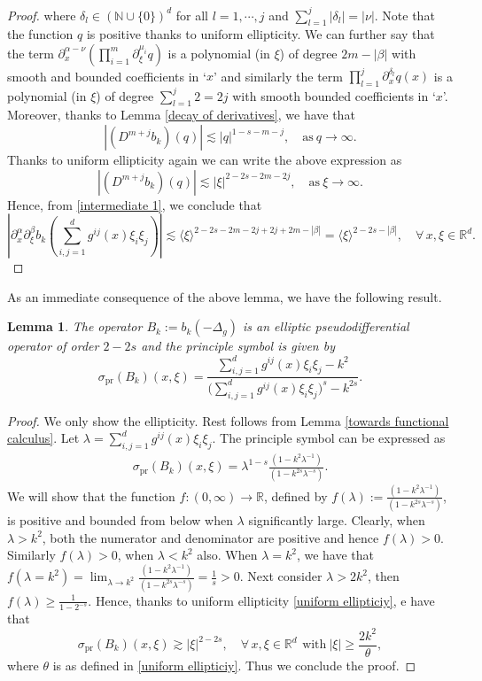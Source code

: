 \documentclass[12pt]{amsart}
\numberwithin{equation}{section}
\newtheorem{lem}[thm]{Lemma}
\theoremstyle{definition}
\theoremstyle{remark}
\numberwithin{equation}{section}
\begin{document}
\begin{proof}
		where $\delta_l\in (\mathbb{N}\cup\{0\})^d$ for all $l=1,\cdots,j$ and $\displaystyle{\sum_{l=1}^j |\delta_l|=|\nu|}$. Note that the function $q$ is positive thanks to uniform ellipticity. We can further say that the term $\displaystyle{\partial^{\alpha-\nu}_{x}\left(\prod_{i=1}^m \partial_{\xi}^{\mu_i} q\right)}$ is a polynomial (in $\xi$) of degree $2m-|\beta|$ with smooth and bounded coefficients in `$x$' and similarly the term $\displaystyle{\prod_{l=1}^{j} \partial_x^{\delta_l} q(x)}$ is a polynomial (in $\xi$) of degree $\displaystyle{\sum_{l=1}^j 2=2j}$ with smooth bounded coefficients in `$x$'. Moreover, thanks to Lemma \ref{decay of derivatives}, we have that 
		\[
		\left| (D^{m+j} b_k)(q)\right| \lesssim | q|^{1-s-m-j}, \quad \mbox{as} \ q\to \infty. 
		\]
		Thanks to uniform ellipticity again we can write the above expression as 
		\[
		\left| (D^{m+j} b_k)(q)\right| \lesssim | \xi|^{2-2s-2m-2j}, \quad \mbox{as} \ \xi\to \infty.
		\]
		Hence, from \eqref{intermediate 1}, we conclude that
		\[
		\left|\partial_x^{\alpha}\partial_{\xi}^{\beta} b_k\left(\sum_{i,j=1}^d g^{ij}(x)\xi_i\xi_j\right)\right|
		\lesssim
		\langle \xi\rangle^{2-2s-2m-2j+2j+2m-|\beta|}=  \langle \xi\rangle^{2-2s-|\beta|}, \quad \forall\, x, \xi\in\mathbb{R}^d.
		\]
	\end{proof}
	As an immediate consequence  of the above lemma, we have the following result.
	\begin{lem}\label{psedodifferential operator of degree}
		The operator $B_k := b_k(-\Delta_g)$ is an elliptic pseudodifferential operator of order $2-2s$ and the principle symbol is given by 
		\[
		\sigma_{\mathrm{pr}}(B_k)(x,\xi)
		=
		\frac{\sum_{i,j=1}^d g^{ij}(x)\xi_i\xi_j-k^2}
		{\bigl( \sum_{i,j=1}^dg^{ij}(x)\xi_i\xi_j\bigr)^s-k^{2s}}.
		\]
	\end{lem}
	\begin{proof}
		We only show the ellipticity. Rest follows from Lemma \ref{towards functional calculus}. Let $\lambda=\sum_{i,j=1}^dg^{ij}(x)\xi_i\xi_j$. The principle symbol can be expressed as 
		\begin{align}\label{intermediate 2}
			\sigma_{\mathrm{pr}}(B_k)(x,\xi)= \lambda^{1-s}\frac{(1-k^2\lambda^{-1})}{(1-k^{2s}\lambda^{-s})}.
		\end{align}
		We will show that the function $f:(0,\infty)\to \mathbb{R}$, defined by $\displaystyle{f(\lambda):=\frac{(1-k^2\lambda^{-1})}{(1-k^{2s}\lambda^{-s})}}$, is positive and bounded from below when $\lambda$ significantly large. Clearly, when $\lambda>k^2$, both the numerator and denominator are positive and hence $f(\lambda)>0$. Similarly $f(\lambda)>0$, when $\lambda<k^2$ also. When $\lambda=k^2$, we have that $\displaystyle{f(\lambda=k^2)=\lim_{\lambda\to k^2}\frac{(1-k^2\lambda^{-1})}{(1-k^{2s}\lambda^{-s})}=\frac{1}{s}>0}$. Next consider $\lambda>2k^2$, then $\displaystyle{f(\lambda)\geq \frac{1}{1-2^{-s}}}$. Hence, thanks to uniform ellipticity \eqref{uniform ellipticiy}, e have that
		\[
		\sigma_{\mathrm{pr}}(B_k)(x,\xi) \gtrsim |\xi|^{2-2s}, \quad \forall \, x,\xi\in\mathbb{R}^d\, \ \text{with}\ |\xi|\geq \frac{2k^2}{\theta},
		\]
		where $\theta$ is as defined in \eqref{uniform ellipticiy}. Thus we conclude the proof.
	\end{proof}
	
\end{document}
